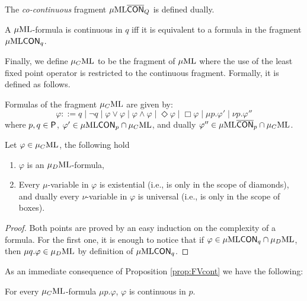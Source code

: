 The  \emph{co-continuous} fragment $\mu\mathrm{ML}\overline{\mathsf{CON}}_{Q}$ is defined dually. 

\begin{proposition}\label{prop:FVcont}
A $\mu\mathrm{ML}$-formula is continuous in $q$ iff it is equivalent to a formula in the fragment $\mu\mathrm{ML}\mathsf{CON}_{q}$.
\end{proposition}

Finally, we define $\mu_{C}\mathrm{ML}$ to be the fragment of $\mu\mathrm{ML}$ where the use of the least fixed point operator is restricted to the continuous fragment. Formally, it is defined as follows.

\begin{definition}
Formulas of the fragment $\mu_{C}\mathrm{ML}$ are given by:%
\begin{equation*}
   \varphi ::= q \mid \lnot q
    \mid \varphi \lor \varphi
        \mid \varphi \land \varphi
    \mid \Diamond \varphi
     \mid \Box \varphi \mid
    \mu p.\varphi' 
    \mid \nu p.\varphi''
    \end{equation*}
%
where $p,q \in \mathsf{P}$,  $\varphi' \in \mu\mathrm{ML}\mathsf{CON}_{p} \cap \mu_{C}\mathrm{ML}$, and dually $\varphi'' \in \mu\mathrm{ML}\overline{\mathsf{CON}}_{p} \cap \mu_{C}\mathrm{ML}$.
\end{definition}

\begin{proposition}
Let $\varphi \in \mu_{C}\mathrm{ML}$, the following hold
\begin{enumerate}[(1)]
\itemsep 0pt
\item $\varphi$ is an $\mu_{D}\mathrm{ML}$-formula,
\item Every $\mu$-variable in $\varphi$ is existential (i.e., is only in the scope of diamonds), and dually every $\nu$-variable in $\varphi$ is universal (i.e., is only in the scope of boxes).
\end{enumerate}
\end{proposition}
\begin{proof}
Both points are proved by an easy induction on the complexity of a formula. For the first one,  it is enough to notice that if $\varphi \in \mu\mathrm{ML}\mathsf{CON}_{q} \cap \mu_{D}\mathrm{ML}$, then $\mu q. \varphi \in \mu_{D}\mathrm{ML}$ by definition of $\mu\mathrm{ML}\mathsf{CON}_{q} $.
\end{proof}

As an immediate consequence of Proposition \ref{prop:FVcont} we have the following:

\begin{corollary}\label{cor:cont}
For every $\mu_{C}\mathrm{ML}$-formula $\mu p. \varphi$, $\varphi$ is continuous in $p$.
\end{corollary}


